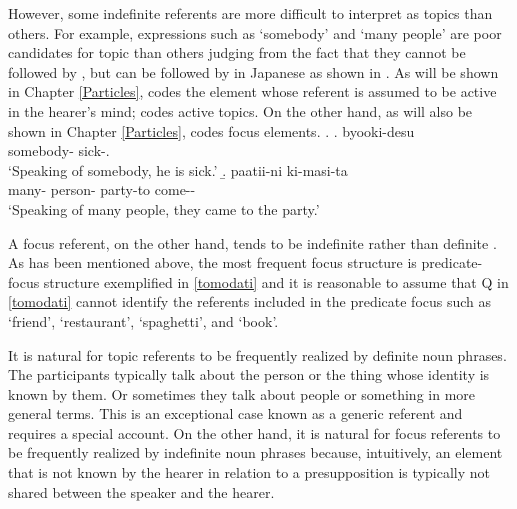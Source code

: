 However,
some indefinite referents are more difficult to interpret as topics than others.
For example, expressions such as  `somebody' and  `many people' are poor candidates for topic than others
judging from the fact that they cannot be followed by , but can be followed by  in Japanese as shown in \Next \cite[][p.\ 37 ff.]{kuno73}.
As will be shown in Chapter \ref{Particles},
 codes the element whose referent is assumed to be active in the hearer's mind;
 codes active topics.
On the other hand, as will also be shown in Chapter \ref{Particles},
 codes focus elements.
\ex. \a.  byooki-desu \\
		somebody- sick-. \\
		`Speaking of somebody, he is sick.'
	\b.   paatii-ni ki-masi-ta \\
		many- person- party-to come-- \\
		`Speaking of many people, they came to the party.'



A focus referent, on the other hand,
tends to be indefinite rather than definite \cite{givon76,keenan76,comrie79,comrie83,dubois87}.
As has been mentioned above,
the most frequent focus structure is predicate-focus structure exemplified in \ref{tomodati} and
it is reasonable to assume that Q in \ref{tomodati} cannot identify the referents included in the predicate focus such as `friend', `restaurant', `spaghetti', and `book'.

%

It is natural for topic referents to be frequently realized by definite noun phrases.
The participants typically talk about the person or the thing whose identity is known by them.
Or sometimes they talk about people or something in more general terms.
This is an exceptional case known as a generic referent and requires a special account.
On the other hand, it is natural for focus referents to be frequently realized by indefinite noun phrases
because, intuitively, an element that is not known by the hearer in relation to a presupposition is typically not shared between the speaker and the hearer.


